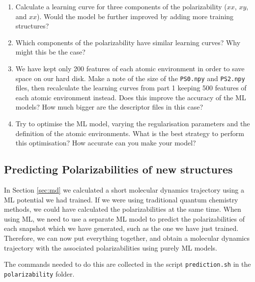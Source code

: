\documentclass{article}
\begin{document}
\begin{enumerate}

\item Calculate a learning curve for three components of the polarizability ($xx$, $xy$, and $xx$). Would the model be further improved by adding more training structures?
\item Which components of the polarizability have similar learning curves? Why might this be the case?
\item We have kept only 200 features of each atomic environment in order to save space on our hard disk. Make a note of the size of the \verb|PS0.npy| and \verb|PS2.npy| files, then recalculate the learning curves from part 1 keeping 500 features of each atomic environment instead. Does this improve the accuracy of the ML models? How much bigger are the descriptor files in this case?
\item Try to optimise the ML model, varying the regularisation parameters and the definition of the atomic environments. What is the best strategy to perform this optimisation? How accurate can you make your model?

\end{enumerate}

\subsection*{Predicting Polarizabilities of new structures}

In Section \ref{sec:md} we calculated a short molecular dynamics trajectory using a ML potential we had trained. If we were using traditional quantum chemistry methods, we could have calculated the polarizabilities at the same time. When using ML, we need to use a separate ML model to predict the polarizabilities of each snapshot which we have generated, such as the one we have just trained. Therefore, we can now put everything together, and obtain a molecular dynamics trajectory with the associated polarizabilities using purely ML models.

The commands needed to do this are collected in the script \verb|prediction.sh| in the \verb|polarizability| folder.
\end{document}
